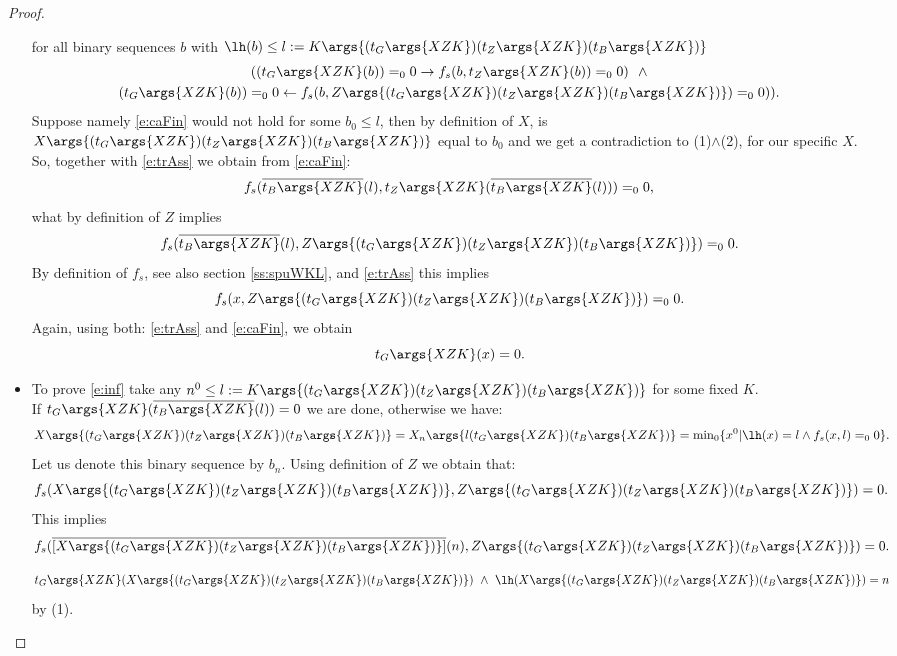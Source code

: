 \begin{proof}
\begin{itemize}
for all binary sequences $b$ with $\lh(b)
  \leq l:=K\args{
    (t_G\args{XZK})
    (t_Z\args{XZK})
    (t_B\args{XZK})
   }$
\begin{multline}
      ((t_G\args{ XZK} (b) )=_00 \rightarrow f_s( b, t_Z \args{ XZK}(b) )=_00 )\ \ \wedge\\
      (t_G\args{ XZK } (b) )=_00 \leftarrow f_s( b, Z\args{
        (t_G\args{XZK})
        (t_Z\args{XZK})
        (t_B\args{XZK})
       }  )=_00 ))
\label{e:caFin}
\text{.}
\end{multline}
Suppose namely \eqref{e:caFin} would not hold for some $b_0\leq l$, then by definition of
$X$, is $X\args{(t_G\args{XZK})(t_Z\args{XZK})(t_B\args{XZK})}$ equal to $b_0$ 
and we get a contradiction to (1)$\wedge$(2), for our specific $X$.\\
So, together with \eqref{e:trAss} we obtain from \eqref{e:caFin}:
\[
f_s( \overline{t_B\args{XZK}}(l), t_Z \args{ XZK}(\overline{t_B\args{XZK}}(l)) )=_00
\text{,}
\]
what by definition of $Z$ implies
\[
f_s( \overline{t_B\args{XZK}}(l), Z\args{(t_G\args{XZK})(t_Z\args{XZK})(t_B\args{XZK})} )=_00
\text{.}
\]
By definition of $f_s$, see also section \ref{ss:spuWKL}, and \eqref{e:trAss} this implies
\[
f_s( x, Z\args{(t_G\args{XZK})(t_Z\args{XZK})(t_B\args{XZK})} )=_00
\text{.}
\]
Again, using both: \eqref{e:trAss} and  \eqref{e:caFin}, we obtain
\[
t_G\args{XZK}(x)=0
\text{.}
\]
\item To prove \eqref{e:inf} take any $n^0\leq l:=K\args{
    (t_G\args{XZK})
    (t_Z\args{XZK})
    (t_B\args{XZK})
   }$ for some fixed $K$.\\
If $t_G\args{XZK}( \overline{t_B\args{XZK}}(l) )=0$ we are done, otherwise 
we have:
\[
X\args{(t_G\args{XZK})(t_Z\args{XZK})(t_B\args{XZK})}=
   X_n\args{l(t_G\args{XZK})(t_B\args{XZK})}=
{\min}_0 \{ x^0 | \lh(x)=l \wedge f_s(x,l)=_00 \}
\text{.}
\]
Let us denote this binary sequence by $b_n$. Using definition of $Z$ we obtain that:
\[
f_s(
  X\args{(t_G\args{XZK})(t_Z\args{XZK})(t_B\args{XZK})} , 
  Z\args{(t_G\args{XZK})(t_Z\args{XZK})(t_B\args{XZK})}
 ) = 0
\text{.}
\]
This implies 
\[
f_s(
  \overline{[X\args{(t_G\args{XZK})(t_Z\args{XZK})(t_B\args{XZK})}]}(n) , 
  Z\args{(t_G\args{XZK})(t_Z\args{XZK})(t_B\args{XZK})}
 ) = 0
\text{.}
\]


\[
t_G\args{XZK}(X\args{(t_G\args{XZK})(t_Z\args{XZK})(t_B\args{XZK})})
\ \wedge\ \lh (X\args{(t_G\args{XZK})(t_Z\args{XZK})(t_B\args{XZK})})=n
\]
by (1).


\end{itemize}
\end{proof}
